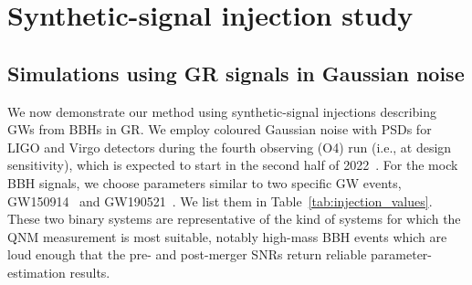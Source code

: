 \documentclass[twocolumn,prd,aps,superscriptaddress,preprintnumbers,tightenlines,showpacs,nofootinbib,eqsecnum,amsfonts,amsmath]{revtex4-1}
\begin{document}


\section{Synthetic-signal injection study}
\label{sec:results}
\subsection{Simulations using GR signals in Gaussian noise} \label{ssec:gr_signal}

We now demonstrate our method using synthetic-signal injections describing GWs
from BBHs in GR. We employ coloured Gaussian noise with PSDs for LIGO and
Virgo detectors during the fourth observing (O4) run (i.e., at design sensitivity), which 
is expected to start in the second half of 2022~\cite{AdvLIGOPSD,TheVirgo:2014hva}.
For the mock BBH signals, we choose parameters similar to two specific GW events, GW150914~\cite{Abbott:2016blz} and
GW190521~\cite{Abbott:2020tfl}. We list them in Table~\ref{tab:injection_values}.
These two binary systems are representative of the kind of systems for which
the QNM measurement is most suitable, notably high-mass BBH events which are loud enough that the
pre- and post-merger SNRs return reliable parameter-estimation results.
\end{document}
